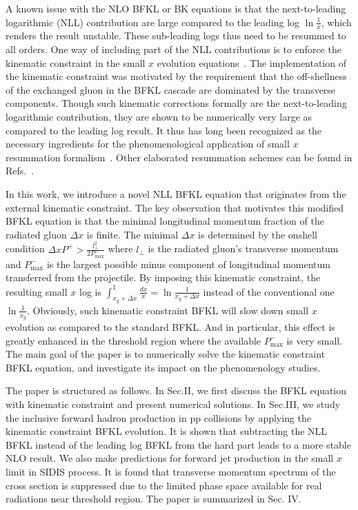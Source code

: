 \documentclass[prd,aps,preprint,tightenlines,nofootinbib,superscriptaddress]{revtex4}
\begin{document}
A known issue with the NLO BFKL or BK equations is that the next-to-leading logarithmic (NLL) contribution are large compared to the leading log $\ln \frac{1}{x}$, which renders the result unstable. These sub-leading logs  thus need to be resummed to all orders. One way of including part of the NLL contributions is to enforce the kinematic constraint in the small $x$ evolution equations~\cite{Ciafaloni:1987ur,Catani:1989yc,Andersson:1995ju,Kwiecinski:1996td,Kwiecinski:1997ee,Smallx:2006lvi}. The implementation of the kinematic constraint was motivated  by the  requirement that the off-shellness of the exchanged gluon in the BFKL cascade are dominated by the transverse components.  Though such kinematic corrections formally are the next-to-leading logarithmic contribution, they are shown to be numerically very large as compared to the leading log result. It thus has long been recognized as the necessary ingredients for the phenomenological application of small $x$ resummation formalism~\cite{Kwiecinski:1997ee,Deak:2019wms}.  Other elaborated resummation schemes can be found in Refs.~\cite{Iancu:2015vea,Ducloue:2019ezk,Zheng:2019zul,Xiang:2020xxe,Xiang:2021rcy}.


In this work, we introduce a novel NLL BFKL equation that originates from the external kinematic constraint. The key observation that motivates this modified BFKL equation is that the minimal  longitudinal momentum fraction of the radiated gluon $\Delta x$ is finite.   The minimal $\Delta x$ is determined by the onshell condition $\Delta x P^+ > \frac{l_\perp^2}{2P^-_\text{max}}$ where $l_\perp$ is the radiated gluon's transverse momentum and $P^-_\text{max}$ is the largest possible minus component of longitudinal momentum transferred from the projectile.  By imposing this kinematic constraint, the resulting small $x$ log is $\int_{x_g+\Delta x}^1 \frac{dx}{x}=\ln \frac{1}{x_g+\Delta x}$ instead of the conventional one $\ln \frac{1}{x_g}$. Obviously, such kinematic constraint BFKL will slow down small $x$ evolution as compared to the standard BFKL.  And in particular, this effect is greatly enhanced  in the threshold region  where the available $P^-_\text{max}$ is very small. The main goal of the paper is to  numerically solve the kinematic constraint BFKL equation, and investigate its impact on the phenomenology studies. 


The paper is structured as follows. In Sec.II, we first discuss  the BFKL equation with kinematic constraint and present numerical solutions.  In Sec.III, we study the inclusive forward hadron production in pp collisions by applying the kinematic constraint BFKL evolution. It is shown that subtracting the NLL BFKL instead of the leading log BFKL from the hard part leads  to a more stable NLO result.  We also make predictions for forward jet production in the small $x$ limit in SIDIS process. It is found that transverse momentum spectrum of the cross section is  suppressed due to the limited phase space available for real radiations near threshold region.   The paper is summarized in Sec. IV.
\end{document}
